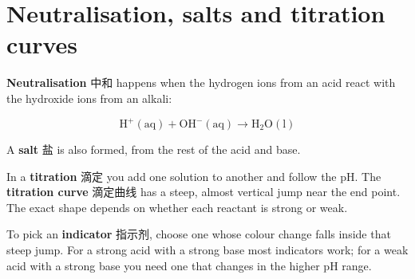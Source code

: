 \documentclass[11pt]{article}
\begin{document}
\section*{Neutralisation, salts and titration curves}

\textbf{Neutralisation} 中和 happens when the hydrogen ions from an acid react with the hydroxide ions from an alkali:

\[
\text{H}^+(\text{aq}) + \text{OH}^-(\text{aq}) \rightarrow \text{H}_2\text{O}(\text{l})
\]

A \textbf{salt} 盐 is also formed, from the rest of the acid and base.

In a \textbf{titration} 滴定 you add one solution to another and follow the pH. The \textbf{titration curve} 滴定曲线 has a steep, almost vertical jump near the end point. The exact shape depends on whether each reactant is strong or weak.

To pick an \textbf{indicator} 指示剂, choose one whose colour change falls inside that steep jump. For a strong acid with a strong base most indicators work; for a weak acid with a strong base you need one that changes in the higher pH range.
\end{document}
